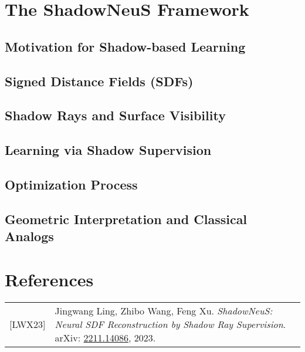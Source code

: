 \documentclass[12pt]{article}
\theoremstyle{definition}
\begin{document}
\newpage

\section{The ShadowNeuS Framework}
\subsection{Motivation for Shadow-based Learning}
\subsection{Signed Distance Fields (SDFs)}
\subsection{Shadow Rays and Surface Visibility}
\subsection{Learning via Shadow Supervision}
\subsection{Optimization Process}
\subsection{Geometric Interpretation and Classical Analogs}


\newpage

\section*{References}
\begin{tabular}{@{}p{} p{}}
{[LWX23]} & Jingwang Ling, Zhibo Wang, Feng Xu. \textit{ShadowNeuS: Neural SDF Reconstruction by Shadow Ray Supervision}. arXiv: \href{https://arxiv.org/abs/2211.14086}{2211.14086}, 2023.
\end{tabular}
\end{document}
